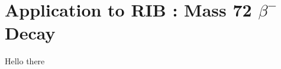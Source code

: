 \documentclass[cnatzke_thesis_proposal.tex]{subfiles}
\begin{document}
\chapter{Application to RIB : Mass 72 $\beta^-$ Decay}

Hello there

\end{document}
